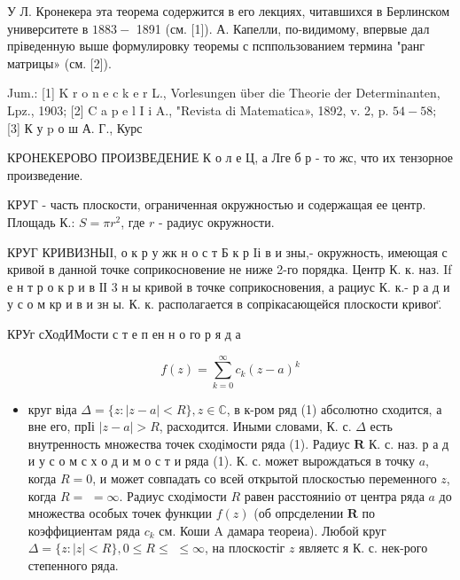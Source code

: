 \documentclass[10pt]{article}
\begin{document}
У Л. Кронекера эта теорема содержится в его лекциях, читавшихся в Берлинском университете в $1883-$ 1891 (см. [1]). А. Капелли, по-видимому, впервые дал пріведенную выше формулировку теоремы с псппользованием термина "ранг матрицы» (см. [2]).



Jum.: [1] K r o n e c k e r L., Vorlesungen über die Theorie der Determinanten, Lpz., 1903; [2] C a p e l I i A., "Revista di Matematica», 1892, v. 2, p. $54-58 ;$ [3] К у p о ш А. Г., Курс



КРОНЕКЕРОВО ПРОИЗВЕДЕНИЕ К $о$ л $е$ Ц, а Лге б р - то жс, что их тензорное произведение.



КРУГ - часть плоскости, ограниченная окружностью и содержащая ее центр. Площадь К.: $S=\pi r^{2}$, где $r$ - радиус окружности.



КРУГ КРИВИЗНЫІ, о к р у жк н о с т Б к р Iі в и зны,- окружность, имеющая с кривой в данной точке соприкосновение не ниже 2-го порядка. Центр К. к. наз. If е н т р о к р и в ІІ 3 н ы кривой в точке соприкосновения, а рациус К. к.- р а д и у с о м кр и в и зн ы. К. к. располагается в сопрікасающейся плоскости кривог̈.



КРУг сХодИМости с т е п ен н о го р я д а



\[

f(z)=\sum_{k=0}^{\infty} c_{k}(z-a)^{k}

\]



\begin{itemize}

  \item круг віда $\Delta=\{z:|z-a|<R\}, z \in \mathbb{C}$, в к-ром ряд (1) абсолютно сходится, а вне его, прІі $|z-a|>R$, расходится. Иными словами, К. с. $\Delta$ есть внутренность множества точек сходімости ряда (1). Радиус $\boldsymbol{R}$ К. с. наз. р а д и у с о м с х о д и м о с т и ряда (1). К. с. может вырождаться в точку $a$, когда $R=0$, и может совпадать со всей открытой плоскостью переменного $z$, когда $R=$ $=\infty$. Радиус сходімости $R$ равен расстояниіо от центра ряда $a$ до множества особых точек функции $f(z)$ (об опрсделении $\boldsymbol{R}$ по коэффициентам ряда $c_{k}$ см. Коши A дамара теореиа). Любой круг $\Delta=\{z:|z|<R\}, 0 \leqslant R \leqslant$ $\leqslant \infty$, на плоскостіг $z$ являетс я К. с. нек-рого степенного ряда.

\end{itemize}
\end{document}
